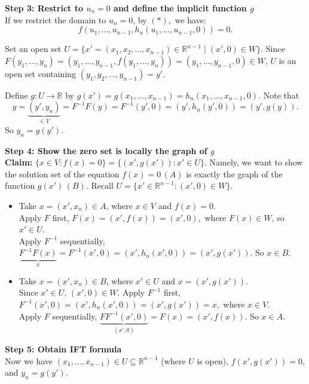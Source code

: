 \begin{pfbox}
\vspace{0.8em}
\noindent \textbf{Step 3: Restrict to $u_n = 0$ and define the implicit function $g$}\\
If we restrict the domain to $u_n = 0$, by $(*),$ we have:
$$
f(u_1, \ldots, u_{n-1}, h_n(u_1, \ldots, u_{n-1}, 0)) = 0.
$$

Set an open set $U = \{ x' = (x_1, x_2, \ldots, x_{n-1}) \in \mathbb{R}^{n-1} \mid (x', 0) \in W \}$.
Since $F(y_1, \ldots, y_n) = (y_1, \ldots, y_{n-1}, f(y_1, \ldots, y_n)) = (y_1, \ldots, y_{n-1}, 0) \in W$, $U$ is an open set containing $(y_1, y_2, \ldots, y_{n-1}) = y'$.

Define $g: U \to \mathbb{R}$ by $g(x') = g(x_1, \ldots, x_{n-1}) = h_n(x_1, \ldots, x_{n-1}, 0)$.
Note that
$$y=\underbrace{(y',y_n)}_{\in V} = F^{-1}F(y)=F^{-1}(y',0)=(y',h_n(y',0))=(y',g(y)).$$
So $y_n = g(y').$


\vspace{0.8em}
\noindent \textbf{Step 4: Show the zero set is locally the graph of $g$}\\
\textbf{Claim:} $\{ x \in V : f(x) = 0 \} = \{ (x', g(x')) : x' \in U \}$.
Namely, we want to show the solution set of the equation $f(x)=0\,(A)$ is exactly the graph of the function $g(x')\,(B)$.
Recall $U=\{x'\in\mathbb{R}^{n-1}: (x',0)\in W\}.$
\begin{itemize}
    \item[$(\subseteq)$] Take $x = (x', x_n) \in A$, where $x\in V$ and $f(x) = 0$.\\
    Apply $F$ first, $F(x)=(x',f(x))=(x',0),$ where $F(x)\in W$, so $x'\in U.$\\
    Apply $F^{-1}$ sequentially,
    $\underbrace{F^{-1}F(x)}_{x}=F^{-1}(x',0)=(x',h_n(x',0))=(x',g(x')).$
    So $x\in B.$
    \item[$(\supseteq)$] Take $x = (x', x_n) \in B$, where $x'\in U$ and $x = (x',g(x'))$.\\
    Since $x'\in U$, $(x',0)\in W$. Apply $F^{-1}$ first, $F^{-1}(x',0)=(x',h_n(x',0))=(x',g(x'))=x,$ where $x\in V$.\\
    Apply $F$ sequentially,
    $\underbrace{FF^{-1}(x',0)}_{(x',0)}=F(x)=(x',f(x)).$
    So $x\in A.$
\end{itemize}

\vspace{0.8em}
\noindent \textbf{Step 5: Obtain IFT formula}\\
Now we have $(x_1, \dots, x_{n-1}) \in U \subseteq \mathbb{R}^{n-1}$ (where $U$ is open), $f(x', g(x')) = 0$, and $y_n = g(y')$.


\end{pfbox}
